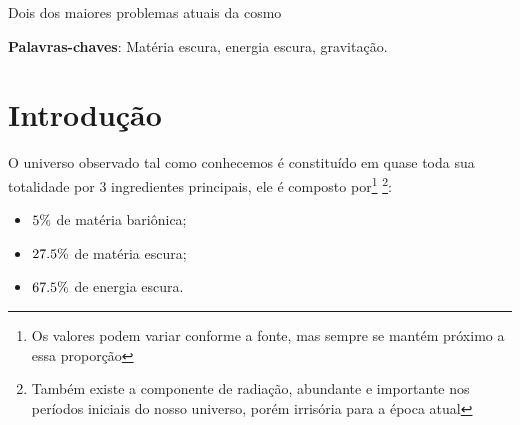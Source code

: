 \documentclass[
	article,			%
	11pt,				%
	twoside,			%
	a4paper,			%
	english,			%
	brazil,				%
	sumario=tradicional
	]{abntex2}
\begin{document}
\frenchspacing


%
%
\maketitle

\begin{resumoumacoluna}
 Dois dos maiores problemas atuais da cosmo

 \vspace{\onelineskip}

 \noindent
 \textbf{Palavras-chaves}: Matéria escura, energia escura, gravitação.
\end{resumoumacoluna}


\textual

\section*{Introdução}


O universo observado tal como conhecemos é constituído em quase toda sua totalidade por 3 ingredientes principais, ele é composto por\footnote{Os valores podem variar conforme a fonte, mas sempre se mantém próximo a essa proporção} \footnote{Também existe a componente de radiação, abundante e importante nos períodos iniciais do nosso universo, porém irrisória para a época atual}:

\begin{itemize}
	\item $\boldmath{5\%}$ de matéria bariônica;
	\item $\boldmath{27.5\%}$ de matéria escura;
	\item $\boldmath{67.5\%}$ de energia escura.
\end{itemize}
\end{document}
